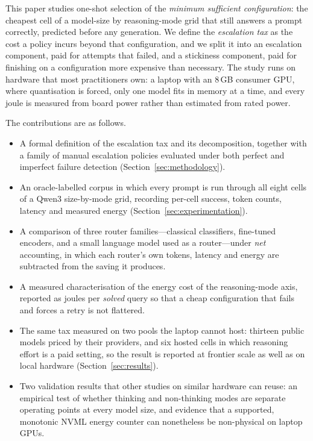 This paper studies one-shot selection of the \emph{minimum sufficient
configuration}: the cheapest cell of a model-size by reasoning-mode grid
that still answers a prompt correctly, predicted before any generation. We
define the \emph{escalation tax} as the cost a policy incurs beyond that
configuration, and we split it into an escalation component, paid for
attempts that failed, and a stickiness component, paid for finishing on a
configuration more expensive than necessary. The study runs on hardware
that most practitioners own: a laptop with an 8\,GB consumer GPU, where
quantisation is forced, only one model fits in memory at a time, and every
joule is measured from board power rather than estimated from rated power.

The contributions are as follows.
\begin{itemize}
  \item A formal definition of the escalation tax and its decomposition,
        together with a family of manual escalation policies evaluated under
        both perfect and imperfect failure detection
        (Section~\ref{sec:methodology}).
  \item An oracle-labelled corpus in which every prompt is run through all
        eight cells of a Qwen3 size-by-mode grid, recording per-cell
        success, token counts, latency and measured energy
        (Section~\ref{sec:experimentation}).
  \item A comparison of three router families---classical classifiers,
        fine-tuned encoders, and a small language model used as a
        router---under \emph{net} accounting, in which each router's own
        tokens, latency and energy are subtracted from the saving it
        produces.
  \item A measured characterisation of the energy cost of the reasoning-mode
        axis, reported as joules per \emph{solved} query so that a cheap
        configuration that fails and forces a retry is not flattered.
  \item The same tax measured on two pools the laptop cannot host:
        thirteen public models priced by their providers, and six hosted
        cells in which reasoning effort is a paid setting, so the result is
        reported at frontier scale as well as on local hardware
        (Section~\ref{sec:results}).
  \item Two validation results that other studies on similar hardware can
        reuse: an empirical test of whether thinking and non-thinking modes
        are separate operating points at every model size, and evidence that
        a supported, monotonic NVML energy counter can nonetheless be
        non-physical on laptop GPUs.
\end{itemize}

